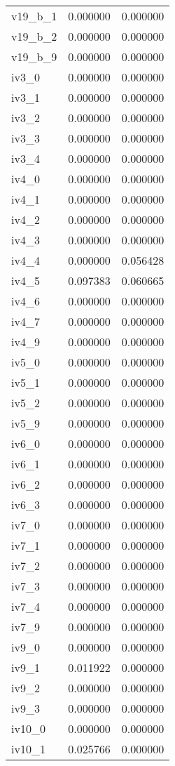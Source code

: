 \begin{tabular}{lrr}
v19_b_1 & 0.000000 & 0.000000 \\
v19_b_2 & 0.000000 & 0.000000 \\
v19_b_9 & 0.000000 & 0.000000 \\
iv3_0 & 0.000000 & 0.000000 \\
iv3_1 & 0.000000 & 0.000000 \\
iv3_2 & 0.000000 & 0.000000 \\
iv3_3 & 0.000000 & 0.000000 \\
iv3_4 & 0.000000 & 0.000000 \\
iv4_0 & 0.000000 & 0.000000 \\
iv4_1 & 0.000000 & 0.000000 \\
iv4_2 & 0.000000 & 0.000000 \\
iv4_3 & 0.000000 & 0.000000 \\
iv4_4 & 0.000000 & 0.056428 \\
iv4_5 & 0.097383 & 0.060665 \\
iv4_6 & 0.000000 & 0.000000 \\
iv4_7 & 0.000000 & 0.000000 \\
iv4_9 & 0.000000 & 0.000000 \\
iv5_0 & 0.000000 & 0.000000 \\
iv5_1 & 0.000000 & 0.000000 \\
iv5_2 & 0.000000 & 0.000000 \\
iv5_9 & 0.000000 & 0.000000 \\
iv6_0 & 0.000000 & 0.000000 \\
iv6_1 & 0.000000 & 0.000000 \\
iv6_2 & 0.000000 & 0.000000 \\
iv6_3 & 0.000000 & 0.000000 \\
iv7_0 & 0.000000 & 0.000000 \\
iv7_1 & 0.000000 & 0.000000 \\
iv7_2 & 0.000000 & 0.000000 \\
iv7_3 & 0.000000 & 0.000000 \\
iv7_4 & 0.000000 & 0.000000 \\
iv7_9 & 0.000000 & 0.000000 \\
iv9_0 & 0.000000 & 0.000000 \\
iv9_1 & 0.011922 & 0.000000 \\
iv9_2 & 0.000000 & 0.000000 \\
iv9_3 & 0.000000 & 0.000000 \\
iv10_0 & 0.000000 & 0.000000 \\
iv10_1 & 0.025766 & 0.000000 \\

\end{tabular}
